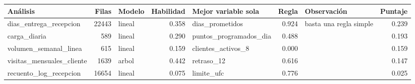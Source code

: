 \begin{tabular}{lrlrlr>{\raggedright\arraybackslash}p{1.9cm}r}
\toprule
Análisis & Filas & Modelo & Habilidad & Mejor variable sola & Regla & Observación & Puntaje \\
\midrule
dias\_entrega\_recepcion & 22443 & lineal & 0.358 & dias\_prometidos & 0.924 & basta una regla simple & 0.239 \\
carga\_diaria & 589 & lineal & 0.290 & puntos\_programados\_dia & 0.488 &  & 0.193 \\
volumen\_semanal\_linea & 615 & lineal & 0.159 & clientes\_activos\_8 & 0.000 &  & 0.159 \\
visitas\_mensuales\_cliente & 1639 & arbol & 0.442 & retraso\_12 & 0.616 &  & 0.147 \\
recuento\_log\_recepcion & 16654 & lineal & 0.075 & limite\_ufc & 0.776 &  & 0.025 \\
\bottomrule
\end{tabular}
